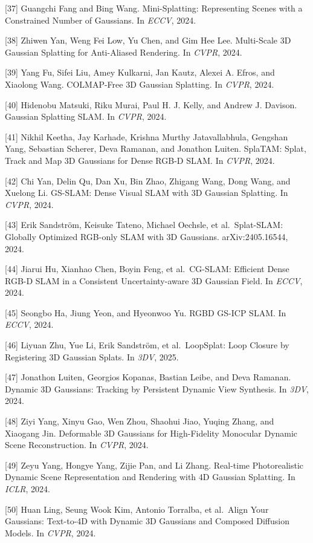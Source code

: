 {[}37{]} Guangchi Fang and Bing Wang. Mini-Splatting: Representing Scenes with a Constrained Number of Gaussians. In \emph{ECCV}, 2024.

{[}38{]} Zhiwen Yan, Weng Fei Low, Yu Chen, and Gim Hee Lee. Multi-Scale 3D Gaussian Splatting for Anti-Aliased Rendering. In \emph{CVPR}, 2024.

{[}39{]} Yang Fu, Sifei Liu, Amey Kulkarni, Jan Kautz, Alexei A. Efros, and Xiaolong Wang. COLMAP-Free 3D Gaussian Splatting. In \emph{CVPR}, 2024.

{[}40{]} Hidenobu Matsuki, Riku Murai, Paul H. J. Kelly, and Andrew J. Davison. Gaussian Splatting SLAM. In \emph{CVPR}, 2024.

{[}41{]} Nikhil Keetha, Jay Karhade, Krishna Murthy Jatavallabhula, Gengshan Yang, Sebastian Scherer, Deva Ramanan, and Jonathon Luiten. SplaTAM: Splat, Track and Map 3D Gaussians for Dense RGB-D SLAM. In \emph{CVPR}, 2024.

{[}42{]} Chi Yan, Delin Qu, Dan Xu, Bin Zhao, Zhigang Wang, Dong Wang, and Xuelong Li. GS-SLAM: Dense Visual SLAM with 3D Gaussian Splatting. In \emph{CVPR}, 2024.

{[}43{]} Erik Sandström, Keisuke Tateno, Michael Oechsle, et al.~Splat-SLAM: Globally Optimized RGB-only SLAM with 3D Gaussians. arXiv:2405.16544, 2024.

{[}44{]} Jiarui Hu, Xianhao Chen, Boyin Feng, et al.~CG-SLAM: Efficient Dense RGB-D SLAM in a Consistent Uncertainty-aware 3D Gaussian Field. In \emph{ECCV}, 2024.

{[}45{]} Seongbo Ha, Jiung Yeon, and Hyeonwoo Yu. RGBD GS-ICP SLAM. In \emph{ECCV}, 2024.

{[}46{]} Liyuan Zhu, Yue Li, Erik Sandström, et al.~LoopSplat: Loop Closure by Registering 3D Gaussian Splats. In \emph{3DV}, 2025.

{[}47{]} Jonathon Luiten, Georgios Kopanas, Bastian Leibe, and Deva Ramanan. Dynamic 3D Gaussians: Tracking by Persistent Dynamic View Synthesis. In \emph{3DV}, 2024.

{[}48{]} Ziyi Yang, Xinyu Gao, Wen Zhou, Shaohui Jiao, Yuqing Zhang, and Xiaogang Jin. Deformable 3D Gaussians for High-Fidelity Monocular Dynamic Scene Reconstruction. In \emph{CVPR}, 2024.

{[}49{]} Zeyu Yang, Hongye Yang, Zijie Pan, and Li Zhang. Real-time Photorealistic Dynamic Scene Representation and Rendering with 4D Gaussian Splatting. In \emph{ICLR}, 2024.

{[}50{]} Huan Ling, Seung Wook Kim, Antonio Torralba, et al.~Align Your Gaussians: Text-to-4D with Dynamic 3D Gaussians and Composed Diffusion Models. In \emph{CVPR}, 2024.

